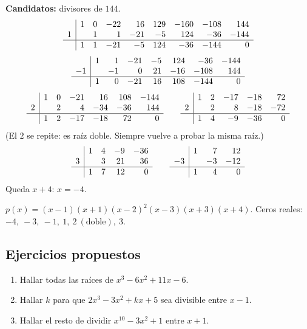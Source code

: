 \documentclass[11pt,a4paper]{article}
\theoremstyle{ej}
\begin{document}
\textbf{Candidatos:} divisores de $144$.
\[
\begin{array}{r|rrrrrrrr}
 & 1 & 0 & -22 & 16 & 129 & -160 & -108 & 144\\
1 & & 1 & 1 & -21 & -5 & 124 & -36 & -144\\ \hline
 & 1 & 1 & -21 & -5 & 124 & -36 & -144 & 0
\end{array}
\]
\[
\begin{array}{r|rrrrrrr}
 & 1 & 1 & -21 & -5 & 124 & -36 & -144\\
-1 & & -1 & 0 & 21 & -16 & -108 & 144\\ \hline
 & 1 & 0 & -21 & 16 & 108 & -144 & 0
\end{array}
\]
\[
\begin{array}{r|rrrrrr}
 & 1 & 0 & -21 & 16 & 108 & -144\\
2 & & 2 & 4 & -34 & -36 & 144\\ \hline
 & 1 & 2 & -17 & -18 & 72 & 0
\end{array}
\qquad
\begin{array}{r|rrrrr}
 & 1 & 2 & -17 & -18 & 72\\
2 & & 2 & 8 & -18 & -72\\ \hline
 & 1 & 4 & -9 & -36 & 0
\end{array}
\]
(El $2$ se repite: es raíz doble. Siempre vuelve a probar la misma raíz.)
\[
\begin{array}{r|rrrr}
 & 1 & 4 & -9 & -36\\
3 & & 3 & 21 & 36\\ \hline
 & 1 & 7 & 12 & 0
\end{array}
\qquad
\begin{array}{r|rrr}
 & 1 & 7 & 12\\
-3 & & -3 & -12\\ \hline
 & 1 & 4 & 0
\end{array}
\]
Queda $x+4$: $x=-4$.
\begin{respuesta}
$p(x)=(x-1)(x+1)(x-2)^2(x-3)(x+3)(x+4)$. Ceros reales: $-4,\ -3,\ -1,\ 1,\ 2\ (\text{doble}),\ 3$.
\end{respuesta}

\subsection{Ejercicios propuestos}
\begin{enumerate}[label=\textbf{R\arabic*.}]
  \item Hallar todas las raíces de $x^3-6x^2+11x-6$.
  \item Hallar $k$ para que $2x^3-3x^2+kx+5$ sea divisible entre $x-1$.
  \item Hallar el resto de dividir $x^{10}-3x^2+1$ entre $x+1$.
\end{enumerate}
\end{document}
